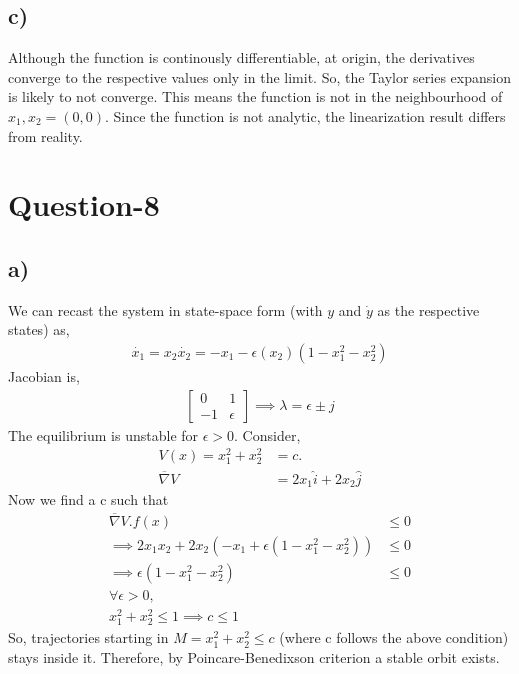 \documentclass{article}
\begin{document}
\subsection*{c)}
Although the function is continously differentiable, at origin, the derivatives converge to the respective values only in the limit. So, the Taylor series expansion is likely to not converge. This means the function is not in the neighbourhood of $x_1, x_2 = (0,0)$. Since the function is not analytic, the linearization result differs from reality.

\section*{Question-8}
\subsection*{a)}
We can recast the system in state-space form (with $y$ and $\dot{y}$ as the respective states) as,
\begin{align*}
    \dot{x_1} = x_2
    \dot{x_2} = - x_1 - \epsilon(x_2)(1 - x_1^2 - x_2^2)
\end{align*}
Jacobian is,
\begin{align*}
    \begin{bmatrix} 0 & 1 \\ -1 & \epsilon \end{bmatrix}
    \implies \lambda = \epsilon \pm j
\end{align*}
The equilibrium is unstable for $\epsilon > 0$. Consider,
\begin{align}
    V(x) = x_1^2 + x_2^2 &= c. \\
    \overline{\nabla}V &= 2x_1\hat{i} + 2x_2\hat{j}
\end{align}
Now we find a c such that
\begin{align*}
    \overline{\nabla}V.f(x) &\leq 0 \\
    \implies 2x_1x_2 + 2x_2(-x_1 + \epsilon(1-x_1^2-x_2^2)) &\leq 0 \\
    \implies \epsilon(1 - x_1^2 - x_2^2) &\leq 0 \\
    \forall \epsilon > 0, \\
    x_1^2 + x_2^2 \leq 1
    \implies c \leq 1
\end{align*}
So, trajectories starting in $M = {x_1^2 + x_2^2 \leq c}$ (where c follows the above condition) stays inside it. Therefore, by Poincare-Benedixson criterion a stable orbit exists.
\end{document}

